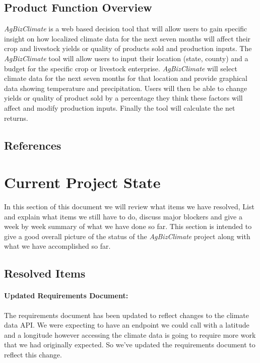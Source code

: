 \documentclass[onecolumn, draftclsnofoot,10pt, compsoc]{article}
\begin{document}
		\subsection{Product Function Overview}
		    \textit{AgBizClimate} is a web based decision tool that will allow users to gain specific insight on how localized climate data for the next seven months will affect their crop and livestock yields or quality of products sold and production inputs. The \textit{AgBizClimate} tool will allow users to input their location (state, county) and a budget for the specific crop or livestock enterprise. \textit{AgBizClimate} will select climate data for the next seven months for that location and provide graphical data showing temperature and precipitation. Users will then be able to change yields or quality of product sold by a percentage they think these factors will affect and modify production inputs. Finally the tool will calculate the net returns.\\



		\renewcommand\refname{\vskip -1cm}
		\subsection{References}

		    \nocite{*}
            
            


\section{Current Project State}
    In this section of this document we will review what items we have resolved, List and explain what items we still have to do, discuss major blockers and give a week by week summary of what we have done so far. This section is intended to give a good overall picture of the status of the \textit{AgBizClimate} project along with what we have accomplished so far.\\

	\subsection{Resolved Items}
		\paragraph{Updated Requirements Document:} The requirements document has been updated to reflect changes to the climate data API. We were expecting to have an endpoint we could call with a latitude and a longitude however accessing the climate data is going to require more work that we had originally expected. So we've updated the requirements document to reflect this change.\\
\end{document}
